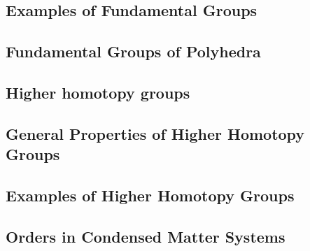 \documentclass[10pt]{article}
\begin{document}
\subsection{Examples of Fundamental Groups}
\subsection{Fundamental Groups of Polyhedra}
\subsection{Higher homotopy groups}
\subsection{General Properties of Higher Homotopy Groups}
\subsection{Examples of Higher Homotopy Groups}
\subsection{Orders in Condensed Matter Systems}
\end{document}
